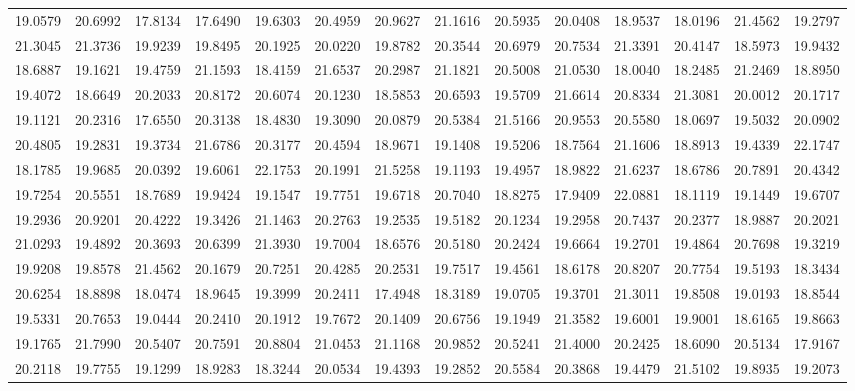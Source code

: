 \documentclass[12pt]{article}\usepackage[]{graphicx}\usepackage[]{color}
\begin{document}
\begin{landscape}
\begin{longtable}[t]{rrrrrrrrrrrrrr}
19.0579 & 20.6992 & 17.8134 & 17.6490 & 19.6303 & 20.4959 & 20.9627 & 21.1616 & 20.5935 & 20.0408 & 18.9537 & 18.0196 & 21.4562 & 19.2797\\
21.3045 & 21.3736 & 19.9239 & 19.8495 & 20.1925 & 20.0220 & 19.8782 & 20.3544 & 20.6979 & 20.7534 & 21.3391 & 20.4147 & 18.5973 & 19.9432\\
18.6887 & 19.1621 & 19.4759 & 21.1593 & 18.4159 & 21.6537 & 20.2987 & 21.1821 & 20.5008 & 21.0530 & 18.0040 & 18.2485 & 21.2469 & 18.8950\\
19.4072 & 18.6649 & 20.2033 & 20.8172 & 20.6074 & 20.1230 & 18.5853 & 20.6593 & 19.5709 & 21.6614 & 20.8334 & 21.3081 & 20.0012 & 20.1717\\
19.1121 & 20.2316 & 17.6550 & 20.3138 & 18.4830 & 19.3090 & 20.0879 & 20.5384 & 21.5166 & 20.9553 & 20.5580 & 18.0697 & 19.5032 & 20.0902\\
20.4805 & 19.2831 & 19.3734 & 21.6786 & 20.3177 & 20.4594 & 18.9671 & 19.1408 & 19.5206 & 18.7564 & 21.1606 & 18.8913 & 19.4339 & 22.1747\\
18.1785 & 19.9685 & 20.0392 & 19.6061 & 22.1753 & 20.1991 & 21.5258 & 19.1193 & 19.4957 & 18.9822 & 21.6237 & 18.6786 & 20.7891 & 20.4342\\
19.7254 & 20.5551 & 18.7689 & 19.9424 & 19.1547 & 19.7751 & 19.6718 & 20.7040 & 18.8275 & 17.9409 & 22.0881 & 18.1119 & 19.1449 & 19.6707\\
19.2936 & 20.9201 & 20.4222 & 19.3426 & 21.1463 & 20.2763 & 19.2535 & 19.5182 & 20.1234 & 19.2958 & 20.7437 & 20.2377 & 18.9887 & 20.2021\\
21.0293 & 19.4892 & 20.3693 & 20.6399 & 21.3930 & 19.7004 & 18.6576 & 20.5180 & 20.2424 & 19.6664 & 19.2701 & 19.4864 & 20.7698 & 19.3219\\
19.9208 & 19.8578 & 21.4562 & 20.1679 & 20.7251 & 20.4285 & 20.2531 & 19.7517 & 19.4561 & 18.6178 & 20.8207 & 20.7754 & 19.5193 & 18.3434\\
20.6254 & 18.8898 & 18.0474 & 18.9645 & 19.3999 & 20.2411 & 17.4948 & 18.3189 & 19.0705 & 19.3701 & 21.3011 & 19.8508 & 19.0193 & 18.8544\\
19.5331 & 20.7653 & 19.0444 & 20.2410 & 20.1912 & 19.7672 & 20.1409 & 20.6756 & 19.1949 & 21.3582 & 19.6001 & 19.9001 & 18.6165 & 19.8663\\
19.1765 & 21.7990 & 20.5407 & 20.7591 & 20.8804 & 21.0453 & 21.1168 & 20.9852 & 20.5241 & 21.4000 & 20.2425 & 18.6090 & 20.5134 & 17.9167\\
20.2118 & 19.7755 & 19.1299 & 18.9283 & 18.3244 & 20.0534 & 19.4393 & 19.2852 & 20.5584 & 20.3868 & 19.4479 & 21.5102 & 19.8935 & 19.2073\\

\end{longtable}
\end{landscape}
\end{document}
